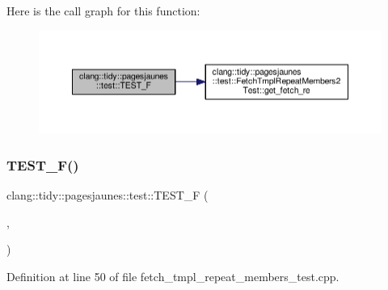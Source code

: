 Here is the call graph for this function\+:
\nopagebreak
\begin{figure}[H]
\begin{center}
\leavevmode
\includegraphics[width=350pt]{namespaceclang_1_1tidy_1_1pagesjaunes_1_1test_a4cddde8142a52210e1a4a2b2d6245319_cgraph}
\end{center}
\end{figure}
\mbox{\label{namespaceclang_1_1tidy_1_1pagesjaunes_1_1test_a68dff4d1bdbff04447e8cc4668b2c01f}} 
\subsubsection{\texorpdfstring{T\+E\+S\+T\+\_\+\+F()}{TEST\_F()}\hspace{0.1cm}{\footnotesize\ttfamily [9/57]}}
{\footnotesize\ttfamily clang\+::tidy\+::pagesjaunes\+::test\+::\+T\+E\+S\+T\+\_\+F (\begin{DoxyParamCaption}\item[{\hyperlink{classclang_1_1tidy_1_1pagesjaunes_1_1test_1_1_fetch_tmpl_repeat_members_test}{Fetch\+Tmpl\+Repeat\+Members\+Test}}]{,  }\item[{Templ\+Repeat\+Members\+Regex\+Matching}]{ }\end{DoxyParamCaption})}



Definition at line 50 of file fetch\+\_\+tmpl\+\_\+repeat\+\_\+members\+\_\+test.\+cpp.

